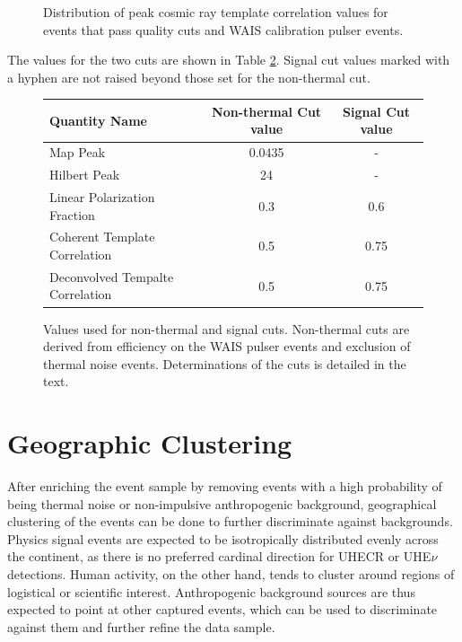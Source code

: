 \begin{figure}
	\centering
	\caption{Distribution of peak cosmic ray template correlation values for events that pass quality cuts and WAIS calibration pulser events.} 
	\label{fig:tempDeconvCut}
\end{figure}
	
	
The values for the two cuts are shown in Table \ref{tab:cutValues}.  Signal cut values marked with a hyphen are not raised beyond those set for the non-thermal cut.

\begin{figure}
\begin{tabular}[c]{|l|c|c|}
\hline
Quantity Name & Non-thermal Cut value & Signal Cut value \\
\hline
Map Peak & 0.0435 & - \\
Hilbert Peak & 24 & - \\
Linear Polarization Fraction & 0.3 & 0.6 \\
Coherent Template Correlation & 0.5 & 0.75 \\
Deconvolved Tempalte Correlation & 0.5 & 0.75 \\
\hline
\end{tabular}
\caption{Values used for non-thermal and signal cuts.  Non-thermal cuts are derived from efficiency on the WAIS pulser events and exclusion of thermal noise events.  Determinations of the cuts is detailed in the text.}
\label{tab:cutValues}
\end{figure}



\section{Geographic Clustering}%
	After enriching the event sample by removing events with a high probability of being thermal noise or non-impulsive anthropogenic background, geographical clustering of the events can be done to further discriminate against backgrounds. Physics signal events are expected to be isotropically distributed evenly across the continent, as there is no preferred cardinal direction for UHECR or UHE$\nu$ detections.  Human activity, on the other hand, tends to cluster around regions of logistical or scientific interest.  Anthropogenic background sources are thus expected to point at other captured events, which can be used to discriminate against them and further refine the data sample. 

